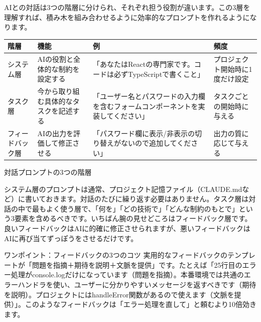 


AIとの対話は3つの階層に分けられ、それぞれ担う役割が違います。この3層を理解すれば、積み木を組み合わせるように効率的なプロンプトを作れるようになります。

\begin{center}
\begin{tabularx}{\linewidth}{|X|X|X|X|}
\hline
\textbf{階層} & \textbf{機能} & \textbf{例} & \textbf{頻度} \tabularnewline
\hline
システム層 & AIの役割と全体的な制約を設定する & 「あなたはReactの専門家です。コードは必ずTypeScriptで書くこと」 & プロジェクト開始時に1度だけ設定 \tabularnewline
タスク層 & 今から取り組む具体的なタスクを記述する & 「ユーザー名とパスワードの入力欄を含むフォームコンポーネントを実装してください」 & タスクごとの開始時に与える \tabularnewline
フィードバック層 & AIの出力を評価して修正させる & 「パスワード欄に表示/非表示の切り替えがないので追加してください」 & 出力の質に応じて与える \tabularnewline
\hline
\end{tabularx}
\end{center}

\begin{center}\small\color{gray}対話プロンプトの3つの階層\end{center}

システム層のプロンプトは通常、プロジェクト記憶ファイル（CLAUDE.mdなど）に書いておきます。対話のたびに繰り返す必要はありません。タスク層は対話の中で最もよく使う層で、「何を」「どの技術で」「どんな制約のもとで」という3要素を含めるべきです。いちばん腕の見せどころはフィードバック層です。良いフィードバックはAIに的確に修正させられますが、悪いフィードバックはAIに再び当てずっぽうをさせるだけです。

\begin{tcbinfo}{ワンポイント：フィードバックの3つのコツ}
実用的なフィードバックのテンプレートが「問題を指摘＋期待を説明＋文脈を提供」です。たとえば「25行目のエラー処理がconsole.logだけになっています（問題を指摘）。本番環境では共通のエラーハンドラを使い、ユーザーに分かりやすいメッセージを返すべきです（期待を説明）。プロジェクトにはhandleError関数があるので使えます（文脈を提供）」。このようなフィードバックは「エラー処理を直して」と頼むより10倍効きます。

\end{tcbinfo}

